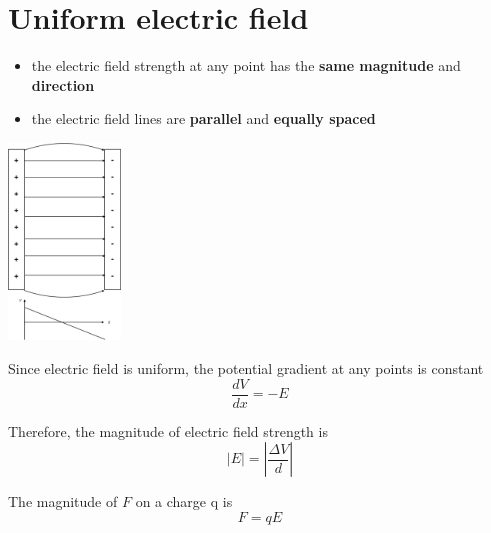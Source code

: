 \documentclass[a4paper, 10pt]{article}
\begin{document}
\section{Uniform electric field}
\begin{itemize}
   \item the electric field strength at any point has the \textbf{same magnitude} and \textbf{direction}
   \item the electric field lines are \textbf{parallel} and \textbf{equally spaced} \\
\end{itemize}	
\begin{minipage}{0.5\textwidth}
\begin{center}
   \includegraphics[trim = 50 50 50 50, width=3cm]{figures/1.pdf} 
\end{center}	
\end{minipage}	
\begin{minipage}{0.5\textwidth}
   Since electric field is uniform, the potential gradient at any points is constant
   \[
   \frac{dV}{dx} = -E
   \]

   Therefore, the magnitude of electric field strength is
   \[
   |E| = \left| \frac{\Delta V}{d} \right|
   \]

   The magnitude of $F$ on a charge q is
   \[
   F = qE
   \]
\end{minipage}	
\end{document}
